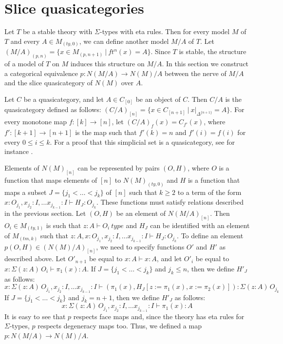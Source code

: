 \documentclass[reqno]{amsart}
\theoremstyle{definition}
\theoremstyle{remark}
\newcommand{\repl}{:=}
\numberwithin{figure}{section}
\begin{document}
\section{Slice quasicategories}

Let $T$ be a stable theory with $\Sigma$-types with eta rules.
Then for every model $M$ of $T$ and every $A \in M_{(ty,0)}$, we can define another model $M/A$ of $T$.
Let $(M/A)_{(p,n)} = \{ x \in M_{(p,n+1)}\ |\ ft^n(x) = A \}$.
Since $T$ is stable, the structure of a model of $T$ on $M$ induces this structure on $M/A$.
In this section we construct a categorical equivalence $p : N(M/A) \to N(M)/A$ between the nerve of $M/A$ and the slice quasicategory of $N(M)$ over $A$.

Let $C$ be a quasicategory, and let $A \in C_{[0]}$ be an object of $C$.
Then $C/A$ is the quasicategory defined as follows: $(C/A)_{[n]} = \{ x \in C_{[n+1]}\ |\ x|_{\Delta^{\{n+1\}}} = A \}$.
For every monotone map $f : [k] \to [n]$, let $(C/A)_f(x) = C_{f'}(x)$, where $f' : [k+1] \to [n+1]$ is the map such that $f'(k) = n$ and $f'(i) = f(i)$ for every $0 \leq i \leq k$.
For a proof that this simplicial set is a quasicategory, see for instance \cite[Proposition~1.2.9.3]{lurie-topos}.

Elements of $N(M)_{[n]}$ can be represented by pairs $(O,H)$, where $O$ is a function that maps elements of $[n]$ to $N(M)_{(ty,0)}$
and $H$ is a function that maps a subset $J = \{ j_1 < \ldots < j_k \}$ of $[n]$ such that $k \geq 2$ to a term of the form $x : O_{j_1}, x_{j_2} : I, \ldots x_{j_{k-1}} : I \vdash H_J : O_{j_k}$.
These functions must satisfy relations described in the previous section.
Let $(O,H)$ be an element of $N(M/A)_{[n]}$.
Then $O_i \in M_{(ty,1)}$ is such that $z : A \vdash O_i\ type$ and $H_J$ can be identified with an element of $M_{(tm,k)}$ such that $z : A, x : O_{j_1}, x_{j_2} : I, \ldots x_{j_{k-1}} : I \vdash H_J : O_{j_k}$.
To define an element $p(O,H) \in (N(M)/A)_{[n]}$, we need to specify functions $O'$ and $H'$ as described above.
Let $O'_{n+1}$ be equal to $x : A \vdash x : A$, and let $O'_i$ be equal to $x : \Sigma(z : A)\,O_i \vdash \pi_1(x) : A$.
If $J = \{ j_1 < \ldots < j_k \}$ and $j_k \leq n$, then we define $H'_J$ as follows:
\[ x : \Sigma (z : A)\,O_{j_1}, x_{j_2} : I, \ldots x_{j_{k-1}} : I \vdash (\pi_1(x), H_J[z \repl \pi_1(x), x \repl \pi_2(x)]) : \Sigma (z : A)\,O_{j_k} \]
If $J = \{ j_1 < \ldots < j_k \}$ and $j_k = n+1$, then we define $H'_J$ as follows:
\[ x : \Sigma (z : A)\,O_{j_1}, x_{j_2} : I, \ldots x_{j_{k-1}} : I \vdash \pi_1(x) : A \]
It is easy to see that $p$ respects face maps and, since the theory has eta rules for $\Sigma$-types, $p$ respects degeneracy maps too.
Thus, we defined a map $p : N(M/A) \to N(M)/A$.
\end{document}
